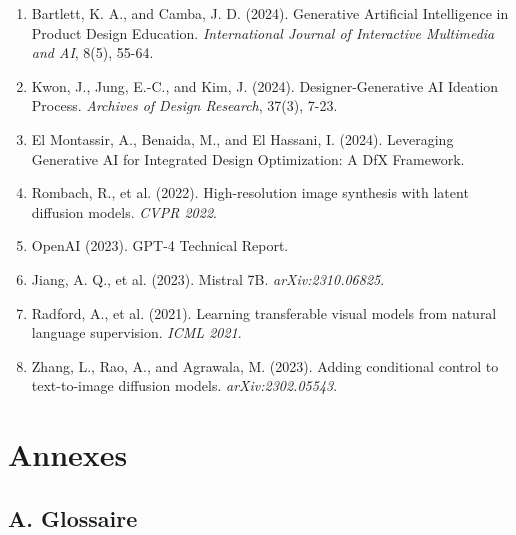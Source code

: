 \documentclass[12pt,a4paper]{article}
\begin{document}
\begin{enumerate}
\item Bartlett, K. A., and Camba, J. D. (2024). Generative Artificial Intelligence in Product Design Education. \textit{International Journal of Interactive Multimedia and AI}, 8(5), 55-64.

\item Kwon, J., Jung, E.-C., and Kim, J. (2024). Designer-Generative AI Ideation Process. \textit{Archives of Design Research}, 37(3), 7-23.

\item El Montassir, A., Benaida, M., and El Hassani, I. (2024). Leveraging Generative AI for Integrated Design Optimization: A DfX Framework.

\item Rombach, R., et al. (2022). High-resolution image synthesis with latent diffusion models. \textit{CVPR 2022}.

\item OpenAI (2023). GPT-4 Technical Report.

\item Jiang, A. Q., et al. (2023). Mistral 7B. \textit{arXiv:2310.06825}.

\item Radford, A., et al. (2021). Learning transferable visual models from natural language supervision. \textit{ICML 2021}.

\item Zhang, L., Rao, A., and Agrawala, M. (2023). Adding conditional control to text-to-image diffusion models. \textit{arXiv:2302.05543}.
\end{enumerate}

\newpage
\section*{Annexes}

\subsection*{A. Glossaire}
\end{document}
